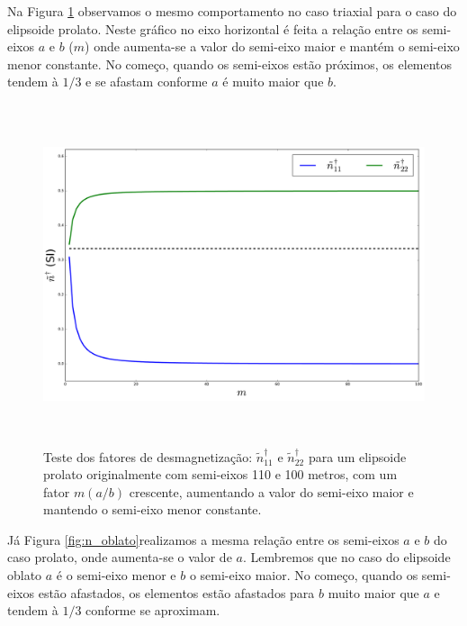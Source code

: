 Na Figura \ref{fig:n_prolato} observamos o mesmo comportamento no caso triaxial para o caso do elipsoide prolato. Neste gráfico no eixo horizontal é feita a relação entre os semi-eixos $a$ e $b$ ($m$) onde aumenta-se a valor do semi-eixo maior e mantém o semi-eixo menor constante. No começo, quando os semi-eixos estão próximos, os elementos tendem à $1/3$ e se afastam conforme $a$ é muito maior que $b$.
\newpage

\begin{figure}[hbt!]
	\centering \includegraphics[width=15cm,height=10cm]{figures/test_n_prolate}
	\caption[Teste dos fatores de desmagnetização para um elipsoide prolato.]{Teste dos fatores de desmagnetização:
		$\tilde{n}^{\dagger}_{11}$ e $\tilde{n}^{\dagger}_{22}$
		para um elipsoide prolato originalmente com semi-eixos 110 e 100 metros, com um fator $m (a/b)$ crescente,
		aumentando a valor do semi-eixo maior e mantendo o semi-eixo menor constante.}
	\label{fig:n_prolato}
\end{figure}

Já Figura \ref{fig:n_oblato}realizamos a mesma relação entre os semi-eixos $a$ e $b$ do caso prolato, onde aumenta-se o valor de $a$. Lembremos que no caso do elipsoide oblato $a$ é o semi-eixo menor e $b$ o semi-eixo maior. No começo, quando os semi-eixos estão afastados, os elementos estão afastados para $b$ muito maior que $a$ e tendem à $1/3$ conforme se aproximam.
\newpage

